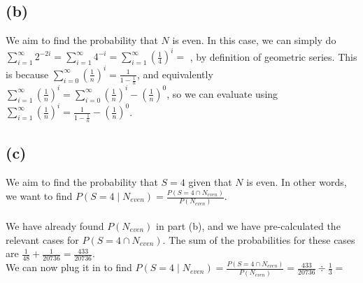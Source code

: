 \documentclass{article}
\begin{document}
{\subsection*{(b)}
We aim to find the probability that $N$ is even. In this case, we can simply do $\sum_{i = 1}^{\infty} 2^{-2i} = \sum_{i = 1}^{\infty} 4^{-i} = \sum_{i = 1}^{\infty} (\frac{1}{4})^i = $ , by definition of geometric series. This is because $\sum_{i=0}^{\infty} (\frac{1}{n})^i = \frac{1}{1-\frac{1}{n}}$, and equivalently $\sum_{i=1}^{\infty} (\frac{1}{n})^i = \sum_{i=0}^{\infty} (\frac{1}{n})^i - (\frac{1}{n})^0$, so we can evaluate using $\sum_{i=1}^{\infty} (\frac{1}{n})^i = \frac{1}{1-\frac{1}{n}} - (\frac{1}{n})^0$. 

\subsection*{(c)}
We aim to find the probability that $S = 4$ given that $N$ is even. In other words, we want to find $P(S = 4 \mid N_{even}) = \frac{P(S = 4 \cap N_{even})}{P(N_{even})}$. \\ \\
We have already found $P(N_{even})$ in part (b), and we have pre-calculated the relevant cases for $P(S = 4 \cap N_{even})$. The sum of the probabilities for these cases are $\frac{1}{48} + \frac{1}{20736} = \frac{433}{20736}$. \\
We can now plug it in to find $P(S = 4 \mid N_{even}) = \frac{P(S = 4 \cap N_{even})}{P(N_{even})} = \frac{433}{20736} \div \frac{1}{3} = $ 

}



\end{document}
